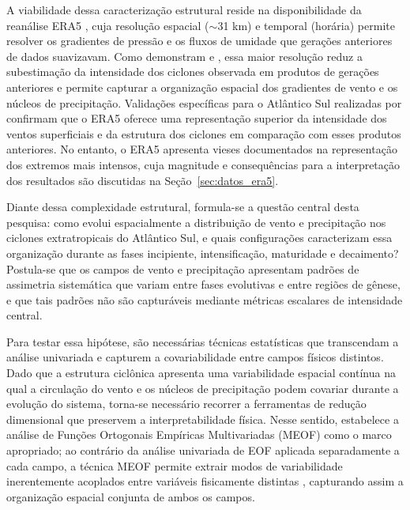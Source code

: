 A viabilidade dessa caracterização estrutural reside na disponibilidade da reanálise ERA5 \citep{hersbach2020era5}, cuja resolução espacial ($\sim$31 km) e temporal (horária) permite resolver os gradientes de pressão e os fluxos de umidade que gerações anteriores de dados suavizavam. Como demonstram \citet{priestley2022improved} e \citet{dalanhese2023new}, essa maior resolução reduz a subestimação da intensidade dos ciclones observada em produtos de gerações anteriores e permite capturar a organização espacial dos gradientes de vento e os núcleos de precipitação. Validações específicas para o Atlântico Sul realizadas por \citet{gramcianinov2020analysis} confirmam que o ERA5 oferece uma representação superior da intensidade dos ventos superficiais e da estrutura dos ciclones em comparação com esses produtos anteriores. No entanto, o ERA5 apresenta vieses documentados na representação dos extremos mais intensos, cuja magnitude e consequências para a interpretação dos resultados são discutidas na Seção~\ref{sec:datos_era5}.


Diante dessa complexidade estrutural, formula-se a questão central desta pesquisa: como evolui espacialmente a distribuição de vento e precipitação nos ciclones extratropicais do Atlântico Sul, e quais configurações caracterizam essa organização durante as fases incipiente, intensificação, maturidade e decaimento? Postula-se que os campos de vento e precipitação apresentam padrões de assimetria sistemática que variam entre fases evolutivas e entre regiões de gênese, e que tais padrões não são capturáveis mediante métricas escalares de intensidade central.

\label{subsec:intro_estrategia_estadistica}
Para testar essa hipótese, são necessárias técnicas estatísticas que transcendam a análise univariada e capturem a covariabilidade entre campos físicos distintos.
Dado que a estrutura ciclônica apresenta uma variabilidade espacial contínua na qual a circulação do vento e os núcleos de precipitação podem covariar durante a evolução do sistema, torna-se necessário recorrer a ferramentas de redução dimensional que preservem a interpretabilidade física. Nesse sentido, \citet{hannachi2007empirical} estabelece a análise de Funções Ortogonais Empíricas Multivariadas (MEOF) como o marco apropriado; ao contrário da análise univariada de EOF aplicada separadamente a cada campo, a técnica MEOF permite extrair modos de variabilidade inerentemente acoplados entre variáveis fisicamente distintas \citep{liang2018multivariate}, capturando assim a organização espacial conjunta de ambos os campos.

